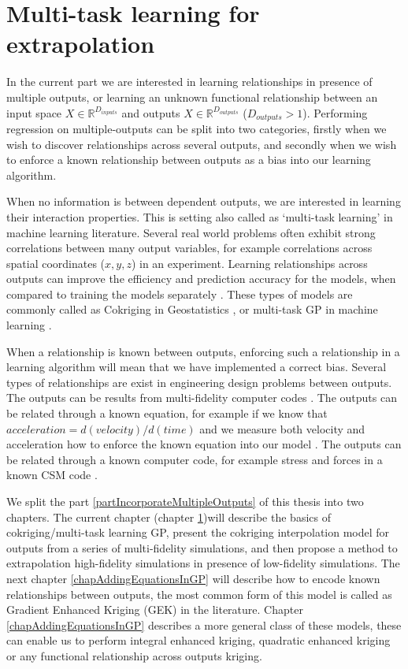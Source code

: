 \chapter{Multi-task learning for extrapolation}
\label{chapMultiTaskExtrapolation}
In the current part we are interested in learning relationships in presence of multiple outputs, or learning an unknown functional relationship between an input space $X \in \mathbb{R}^{D_{inputs}}$ and outputs  $X \in \mathbb{R}^{D_{outputs}}$ ($D_{outputs}>1$). Performing regression on multiple-outputs can be split into two categories, firstly when we wish to discover relationships across several outputs, and secondly when we wish to enforce a known relationship between outputs as a bias into our learning algorithm.

When no information is between dependent outputs, we are interested in learning their interaction properties. This is setting also called as `multi-task learning' in machine learning literature. Several real world problems often exhibit strong correlations between many output variables, for example correlations across spatial coordinates ($x, y, z$) in an experiment. Learning relationships across outputs can improve the efficiency and prediction accuracy for the models, when compared to training the models separately \cite{caruana1998multitask}. These types of models are commonly called as Cokriging in Geostatistics \cite{helterbrand1994universal, chilès1999geostatistics, ver1998constructing}, or multi-task GP in machine learning \cite{alvarez2011kernels, bonilla_multi-task_2008, Boyle05dependentgaussian}.

When a relationship is known between outputs, enforcing such a relationship in a learning algorithm will mean that we have implemented a correct bias. Several types of relationships are exist in engineering design problems between outputs. The outputs can be results from multi-fidelity computer codes \cite{kennedy2000predicting, forrester2007multi, le2013multi}. The outputs can be related through a known equation, for example if we know that $acceleration = d(velocity)/d(time)$ and we measure both velocity and acceleration how to enforce the known equation into our model \cite{ginsbourger2013invariances, sarkka2011linear}. The outputs can be related through a known computer code, for example stress and forces in a known CSM code \cite{Constantinescu2013}. 

We split the part \ref{partIncorporateMultipleOutputs} of this thesis into two chapters. The current chapter (chapter \ref{chapMultiTaskExtrapolation})will describe the basics of cokriging/multi-task learning GP, present the cokriging interpolation model for outputs from a series of multi-fidelity simulations, and then propose a method to extrapolation high-fidelity simulations in presence of low-fidelity simulations. The next chapter \ref{chapAddingEquationsInGP} will describe how to encode known relationships between outputs, the most common form of this model is called as Gradient Enhanced Kriging (GEK) in the literature. Chapter \ref{chapAddingEquationsInGP} describes a more general class of these models, these can enable us to perform integral enhanced kriging, quadratic enhanced kriging or any functional relationship across outputs kriging. 

